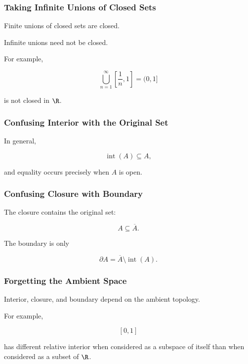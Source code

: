 \subsubsection{Taking Infinite Unions of Closed Sets}

Finite unions of closed sets are closed.

Infinite unions need not be closed.

For example,

\[
\bigcup_{n=1}^{\infty}
\left[
\frac1n,1
\right]
=
(0,1]
\]

is not closed in \(\R\).

\subsubsection{Confusing Interior with the Original Set}

In general,

\[
\operatorname{int}(A)
\subseteq A,
\]

and equality occurs precisely when \(A\) is open.

\subsubsection{Confusing Closure with Boundary}

The closure contains the original set:

\[
A\subseteq\overline{A}.
\]

The boundary is only

\[
\partial A
=
\overline{A}\setminus\operatorname{int}(A).
\]

\subsubsection{Forgetting the Ambient Space}

Interior, closure, and boundary depend on the ambient topology.

For example,

\[
[0,1]
\]

has different relative interior when considered as a subspace of itself than
when considered as a subset of \(\R\).

